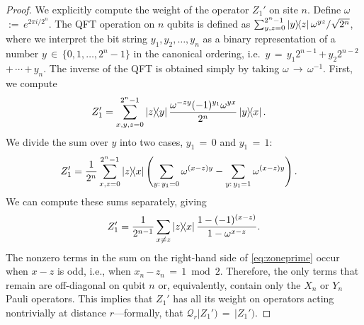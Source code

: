 \begin{proof}
We explicitly compute the weight of the operator $Z_1'$ on site $n$.
Define $\omega$\,$:=$\,$e^{2\pi i/2^n}$.
The QFT operation on $n$ qubits is defined as $\sum_{y,z=0}^{2^n-1} \ketbra{y}{z} {\omega^{yz}}/{\sqrt{2^n}}$, where we interpret the bit string $y_1, y_2, \ldots, y_n$ as a binary representation of a number $y$\,$\in$\,$\{0,1,\ldots, 2^n -1\}$ in the canonical ordering, i.e.\ $y$\,$=$\,$y_1 2^{n-1}$\,$+$\,$y_2 2^{n-2}$\,$+$\,$\cdots$\,$+$\,$y_n$.
The inverse of the QFT is obtained simply by taking $\omega$\,$\rightarrow$\,$\omega^{-1}$.
First, we compute
\begin{align}
Z_1' &= \sum_{x,y,z=0}^{2^n-1} \ketbra{z}{y} \frac{\omega^{-z y}(-1)^{y_1} \omega^{yx}}{2^n} \ketbra{y}{x}.
\end{align}
We divide the sum over $y$ into two cases, $y_1$\,$=$\,$0$ and $y_1$\,$=$\,$1$:
\begin{align}
Z_1' &= \frac{1}{2^n}\sum_{x,z=0}^{2^n-1} \ketbra{z}{x} \left(\sum_{y:\, y_1 = 0} \omega^{(x-z) y} - \sum_{y:\, y_1= 1} \omega^{(x-z) y}\right).
\end{align}
We can compute these sums separately, giving
\begin{align}
\label{eq:zoneprime}
Z_1' = \frac{1}{2^{n-1}}\sum_{x\neq z}\ketbra{z}{x} \frac{1 - (-1)^{(x-z)}}{1-\omega^{x-z}}.
\end{align}
The nonzero terms in the sum on the right-hand side of \cref{eq:zoneprime} occur when $x-z$ is odd, i.e., when $x_n$\,$-$\,$z_n$\,$=$\,$1 \bmod 2$.
Therefore, the only terms that remain are off-diagonal on qubit $n$ or, equivalently, contain only the $X_n$ or $Y_n$ Pauli operators.
This implies that $Z_1'$ has all its weight on operators acting nontrivially at distance $r$---formally, that $\mathcal{Q}_r |Z_1')$\,$=$\,$|Z_1')$.
\end{proof}

